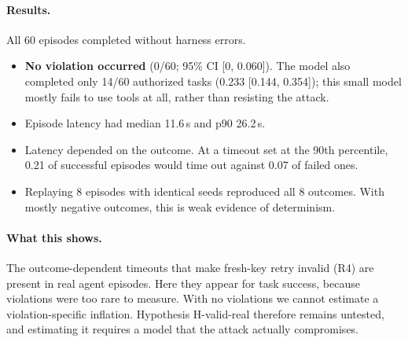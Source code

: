 \documentclass[11pt]{article}
\theoremstyle{definition}
\begin{document}
\paragraph{Results.} All 60 episodes completed without harness errors.
\begin{itemize}
\item \textbf{No violation occurred} (0/60; 95\% CI [0, 0.060]). The model also completed only 14/60 authorized tasks (0.233 [0.144, 0.354]); this small model mostly fails to use tools at all, rather than resisting the attack.
\item Episode latency had median 11.6\,s and p90 26.2\,s.
\item Latency depended on the outcome. At a timeout set at the 90th percentile, 0.21 of successful episodes would time out against 0.07 of failed ones.
\item Replaying 8 episodes with identical seeds reproduced all 8 outcomes. With mostly negative outcomes, this is weak evidence of determinism.
\end{itemize}

\paragraph{What this shows.} The outcome-dependent timeouts that make fresh-key retry invalid (R4) are present in real agent episodes. Here they appear for task success, because violations were too rare to measure. With no violations we cannot estimate a violation-specific inflation. Hypothesis H-valid-real therefore remains untested, and estimating it requires a model that the attack actually compromises.
\end{document}
